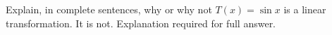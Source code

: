 {Explain, in complete sentences, why or why not $T(x) = \sin x$ is a linear transformation.
}
{It is not. Explanation required for full answer.
}